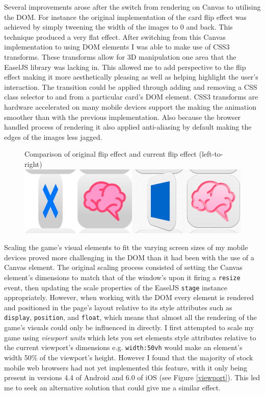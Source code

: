 \documentclass[final]{cmpreport}
\begin{document}
Several improvements arose after the switch from rendering on Canvas to utilising the DOM. For instance the original implementation of the card flip effect was achieved by simply tweening the width of the images to 0 and back. This technique produced a very flat effect. After switching from this Canvas implementation to using DOM elements I was able to make use of CSS3 transforms. These transforms allow for 3D manipulation one area that the EaselJS library was lacking in. This allowed me to add perspective to the flip effect making it more aesthetically pleasing as well as helping highlight the user's interaction. The transition could be applied through adding and removing a CSS class selector to and from a particular card's DOM element. CSS3 transforms are hardware accelerated on many mobile devices support the making the animation smoother than with the previous implementation. Also because the browser handled process of rendering it also applied anti-aliasing by default making the edges of the images less jagged.

\begin{figure}[h!]{Comparison of original flip effect and current flip effect (left-to-right)\label{transforms}}
  \includegraphics[width=1.0\textwidth]{transforms.png}
\end{figure}

Scaling the game's visual elements to fit the varying screen sizes of my mobile devices proved more challenging in the DOM than it had been with the use of a Canvas element. The original scaling process consisted of setting the Canvas element's dimensions to match that of the window's upon it firing a \texttt{resize} event, then updating the scale properties of the EaselJS \texttt{stage} instance appropriately. However, when working with the DOM every element is rendered and positioned in the page's layout relative to its style attributes such as \texttt{display}, \texttt{position}, and \texttt{float}, which means that almost all the rendering of the game's visuals could only be influenced in directly. I first attempted to scale my game using \textit{viewport units} which lets you set elements style attributes relative to the current viewport's dimensions e.g. \texttt{width:50vh} would make an element's width 50\% of the viewport's height. However I found that the majority of stock mobile web browsers had not yet implemented this feature, with it only being present in versions 4.4 of Android and 6.0 of iOS (see Figure \ref{viewport}). This led me to seek an alternative solution that could give me a similar effect.
\end{document}
